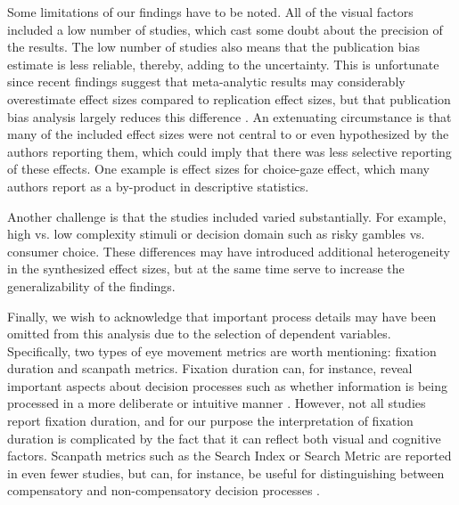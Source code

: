 Some limitations of our findings have to be noted. All of the visual factors included a low number of studies, which cast some doubt about the precision of the results. The low number of studies also means that the publication bias estimate is less reliable, thereby, adding to the uncertainty. This is unfortunate since recent findings suggest that meta-analytic results may considerably overestimate effect sizes compared to replication effect sizes, but that publication bias analysis largely reduces this difference \citep{kvarven2020}. An extenuating circumstance is that many of the included effect sizes were not central to or even hypothesized by the authors reporting them, which could imply that there was less selective reporting of these effects. One example is effect sizes for choice-gaze effect, which many authors report as a by-product in descriptive statistics. 

Another challenge is that the studies included varied substantially. For example, high vs. low complexity stimuli or decision domain such as risky gambles vs. consumer choice. These differences may have introduced additional heterogeneity in the synthesized effect sizes, but at the same time serve to increase the generalizability of the findings. 

Finally, we wish to acknowledge that important process details may have been omitted from this analysis due to the selection of dependent variables. Specifically, two types of eye movement metrics are worth mentioning: fixation duration and scanpath metrics. Fixation duration can, for instance, reveal important aspects about decision processes such as whether information is being processed in a more deliberate or intuitive manner \citep{horstmann2009}. However, not all studies report fixation duration, and for our purpose the interpretation of fixation duration is complicated by the fact that it can reflect both visual and cognitive factors. Scanpath metrics such as the Search Index or Search Metric \citep{payne1976} are reported in even fewer studies, but can, for instance, be useful for distinguishing between compensatory and non-compensatory decision processes \citep{perkovic2018, schoemann2019}.



